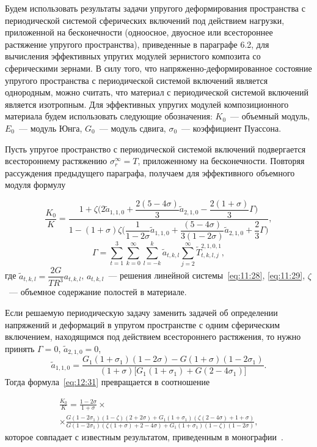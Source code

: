 Будем использовать результаты задачи упругого деформирования пространства с периодической системой сферических включений под действием нагрузки, приложенной на бесконечности (одноосное, двуосное или всестороннее растяжение упругого пространства), приведенные в параграфе 6.2, для вычисления эффективных упругих модулей зернистого композита со сферическими зернами. В силу того, что на\-пряжен\-но-де\-фор\-ми\-ро\-ван\-ное состояние упругого пространства с периодической системой включений является однородным, можно считать, что материал с периодической системой включений является изотропным. Для эффективных упругих модулей композиционного материала будем использовать следующие обозначения: $K_0$~--- объемный модуль, $E_0$~--- модуль Юнга, $G_0$~--- модуль сдвига, $\sigma_0$~--- коэффициент Пуассона.

Пусть упругое пространство с периодической системой включений подвергается всестороннему растяжению $\sigma_r^\infty=T$, приложенному на бесконечности. Повторяя рассуждения предыдущего параграфа, получаем для эффективного объемного модуля формулу

\begin{equation}
\frac{K_0}{K}=\frac{1+\zeta\bigg(2 \tilde a_{1,1,0}+\dfrac{2(5-4\sigma)}{3} \tilde a_{2,1,0}-\dfrac{2(1+\sigma)}{3}\Gamma\bigg)}{1-(1+\sigma)\zeta\bigg(\dfrac{1}{1-2\sigma} \tilde a_{1,1,0}+\dfrac{(5-4\sigma)}{3(1-2\sigma)} \tilde a_{2,1,0}+\dfrac{2}{3}\Gamma\bigg)},
\label{eq:12:31}
\end{equation}
$$
\Gamma=\sum\limits_{t=1}^3\sum\limits_{k=0}^\infty\sum\limits_{l=-k}^k \tilde a_{t,k,l}\sum\limits_{j=2}^\infty\tilde T_{t,k,l,j}^{2,1,0,1},
$$
где $\tilde a_{t,k,l}=\dfrac{2G}{TR^3}a_{t,k,l}$, $a_{t,k,l}$~--- решения линейной системы~\eqref{eq:11:28}, \eqref{eq:11:29}, $\zeta$~--- объемное содержание полостей в материале.

Если решаемую периодическую задачу заменить задачей об определении напряжений и деформаций в упругом пространстве с одним сферическим включением, находящимся под действием всестороннего растяжения, то нужно принять $\Gamma=0$, $\tilde a_{2,1,0}=0$,
$$
\tilde a_{1,1,0}=\frac{G_1(1+\sigma_1)(1-2\sigma)-G(1+\sigma)(1-2\sigma_1)}{(1+\sigma)\bigg\lbrack G_1(1+\sigma_1)+G(2-4\sigma_1)\bigg\rbrack}.
$$
Тогда формула~\eqref{eq:12:31} превращается в соотношение

\begin{multline}
\frac{K_0}{K}=\frac{1-2\sigma}{1+\sigma}\times \\
\times\frac{G(1-2\sigma_1)(1-\zeta)(2+2\sigma)+G_1(1+\sigma_1)(\zeta(2-4\sigma)+1+\sigma)}{G(1-2\sigma_1)(\zeta(1+\sigma)+2-4\sigma)+G_1(1+\sigma_1)(1-\zeta)(1-2\sigma)},
\label{eq:12:32}
\end{multline}  
которое совпадает с известным результатом, приведенным в монографии~\cite{Vanin1985}.

